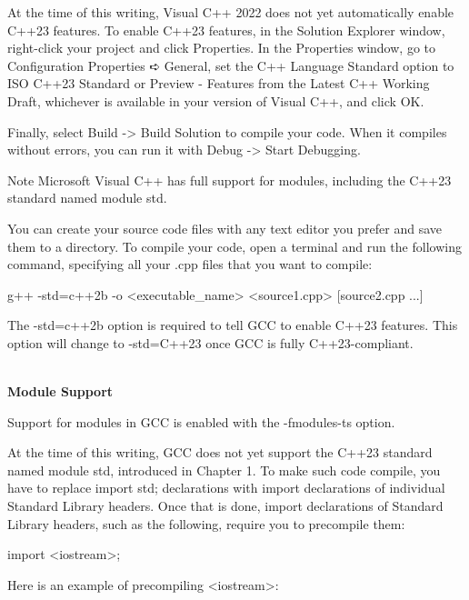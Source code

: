 At the time of this writing, Visual C++ 2022 does not yet automatically enable C++23 features. To enable C++23 features, in the Solution Explorer window, right-click your project and click Properties. In the Properties window, go to Configuration Properties ➪ General, set the C++ Language Standard option to ISO C++23 Standard or Preview - Features from the Latest C++ Working Draft, whichever is available in your version of Visual C++, and click OK.

Finally, select Build -> Build Solution to compile your code. When it compiles without errors, you can run it with Debug -> Start Debugging.

\begin{myNotic}{Note}
Microsoft Visual C++ has full support for modules, including the C++23 standard named module std.
\end{myNotic}


You can create your source code files with any text editor you prefer and save them to a directory. To compile your code, open a terminal and run the following command, specifying all your .cpp files that you want to compile:

\begin{shell}
g++ -std=c++2b -o <executable_name> <source1.cpp> [source2.cpp ...]
\end{shell}

The -std=c++2b option is required to tell GCC to enable C++23 features. This option will change to -std=C++23 once GCC is fully C++23-compliant.

\hspace*{\fill} \\
\textbf{Module Support}

Support for modules in GCC is enabled with the -fmodules-ts option.

At the time of this writing, GCC does not yet support the C++23 standard named module std, introduced in Chapter 1. To make such code compile, you have to replace import std; declarations with import declarations of individual Standard Library headers. Once that is done, import declarations of Standard Library headers, such as the following, require you to precompile them:

\begin{cpp}
import <iostream>;
\end{cpp}

Here is an example of precompiling <iostream>:

